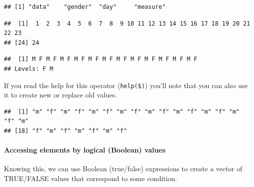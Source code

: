 \documentclass[]{article}
\newenvironment{Shaded}{\begin{snugshade}}{\end{snugshade}}
\newcommand{\KeywordTok}[1]{\textcolor[rgb]{0.13,0.29,0.53}{\textbf{#1}}}
\newcommand{\StringTok}[1]{\textcolor[rgb]{0.31,0.60,0.02}{#1}}
\newcommand{\CommentTok}[1]{\textcolor[rgb]{0.56,0.35,0.01}{\textit{#1}}}
\newcommand{\OperatorTok}[1]{\textcolor[rgb]{0.81,0.36,0.00}{\textbf{#1}}}
\newcommand{\NormalTok}[1]{#1}
\let\oldparagraph\paragraph
\renewcommand{\paragraph}[1]{\oldparagraph{#1}\mbox{}}
\begin{document}
\begin{verbatim}
## [1] "data"    "gender"  "day"     "measure"
\end{verbatim}

\begin{Shaded}
\end{Shaded}

\begin{verbatim}
##  [1]  1  2  3  4  5  6  7  8  9 10 11 12 13 14 15 16 17 18 19 20 21 22 23
## [24] 24
\end{verbatim}

\begin{Shaded}
\end{Shaded}

\begin{verbatim}
##  [1] M F M F M F M F M F M F M F M F M F M F M F M F
## Levels: F M
\end{verbatim}

If you read the help for this operator
(\texttt{help(\textquotesingle{}\$\textquotesingle{})}) you'll note that
you can also use it to create new or replace old values.

\begin{Shaded}
\end{Shaded}

\begin{verbatim}
##  [1] "m" "f" "m" "f" "m" "f" "m" "f" "m" "f" "m" "f" "m" "f" "m" "f" "m"
## [18] "f" "m" "f" "m" "f" "m" "f"
\end{verbatim}

\paragraph{Accessing elements by logical (Boolean)
values}\label{accessing-elements-by-logical-boolean-values}

Knowing this, we can use Boolean (true/false) expressions to create a
vector of TRUE/FALSE values that correspond to some condition.
\end{document}
